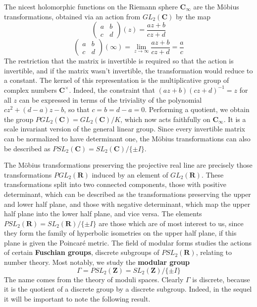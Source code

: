The nicest holomorphic functions on the Riemann sphere $\mathbf{C}_\infty$ are the M\"{o}bius transformations, obtained via an action from $GL_2(\mathbf{C})$ by the map
%
\[ \begin{pmatrix} a & b \\ c & d \end{pmatrix}(z)  = \frac{az + b}{cz + d} \]
%
\[ \begin{pmatrix} a & b \\ c & d \end{pmatrix}(\infty) = \lim_{z \to \infty } \frac{az + b}{cz + d} = \frac{a}{c} \]
%
The restriction that the matrix is invertible is required so that the action is invertible, and if the matrix wasn't invertible, the transformation would reduce to a constant. The kernel of this representation is the multiplicative group of complex numbers $\mathbf{C}^\times$. Indeed, the constraint that $(az + b)(cz + d)^{-1} = z$ for all $z$ can be expressed in terms of the triviality of the polynomial $cz^2 + (d-a)z - b$, so that $c = b = d-a = 0$. Performing a quotient, we obtain the group $PGL_2(\mathbf{C}) = GL_2(\mathbf{C})/K$, which now acts faithfully on $\mathbf{C}_\infty$. It is a scale invariant version of the general linear group. Since every invertible matrix can be normalized to have determinant one, the M\"{o}bius transformations can also be described as $PSL_2(\mathbf{C}) = SL_2(\mathbf{C})/\{ \pm I \}$.

The M\"{o}bius transformations preserving the projective real line are precisely those transformations $PGL_2(\mathbf{R})$ induced by an element of $GL_2(\mathbf{R})$. These transformations split into two connected components, those with positive determinant, which can be described as the transformations preserving the upper and lower half plane, and those with negative determinant, which map the upper half plane into the lower half plane, and vice versa. The elements $PSL_2(\mathbf{R}) = SL_2(\mathbf{R})/\{ \pm I \}$ are those which are of most interest to us, since they form the family of hyperbolic isometries on the upper half plane, if this plane is given the Poincar\'{e} metric. The field of modular forms studies the actions of certain {\bf Fuschian groups}, discrete subgroups of $PSL_2(\mathbf{R})$, relating to number theory. Most notably, we study the {\bf modular group}
%
\[ \Gamma = PSL_2(\mathbf{Z}) = SL_2(\mathbf{Z})/\{ \pm I \} \]
%
The name comes from the theory of moduli spaces. Clearly $\Gamma$ is discrete, because it is the quotient of a discrete group by a discrete subgroup. Indeed, in the sequel it will be important to note the following result.

